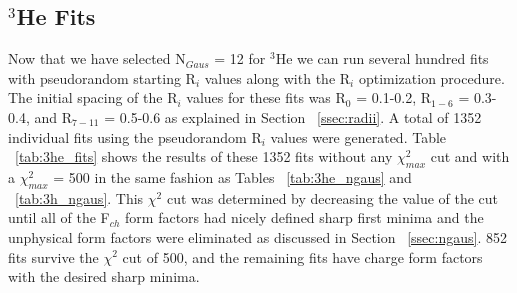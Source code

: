 \subsection{$^3$He Fits}
\label{ssec:3he_fits}

Now that we have selected N$_{Gaus}$ = 12 for $^3$He we can run several hundred fits with pseudorandom starting R$_i$ values along with the R$_i$ optimization procedure. The initial spacing of the R$_i$ values for these fits was R$_0$ = 0.1-0.2, R$_{1-6}$ = 0.3-0.4, and R$_{7-11}$ = 0.5-0.6 as explained in Section ~\ref{ssec:radii}. A total of 1352 individual fits using the pseudorandom R$_i$ values were generated. Table ~\ref{tab:3he_fits} shows the results of these 1352 fits without any $\chi^2_{max}$ cut and with a $\chi^2_{max}$ = 500 in the same fashion as Tables ~\ref{tab:3he_ngaus} and ~\ref{tab:3h_ngaus}. This $\chi^2$ cut was determined by decreasing the value of the cut until all of the F$_{ch}$ form factors had nicely defined sharp first minima and the unphysical form factors were eliminated as discussed in Section ~\ref{ssec:ngaus}. 852 fits survive the $\chi^2$ cut of 500, and the remaining fits have charge form factors with the desired sharp minima.


